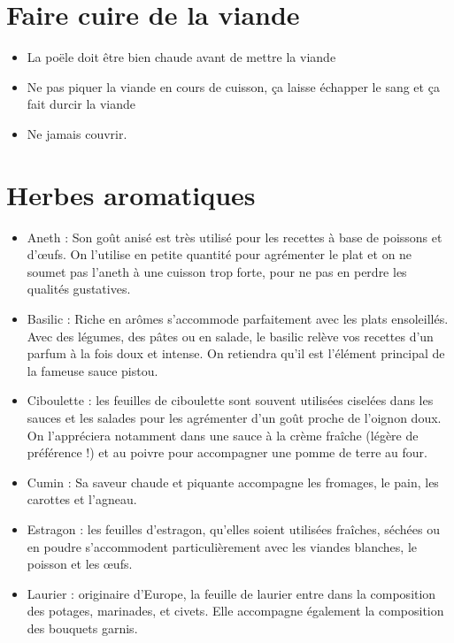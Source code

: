 \documentclass[a4paper,twoside]{report}
\begin{document}
\section{Faire cuire de la viande}
\begin{itemize}
\item La poële doit être bien chaude avant de mettre la viande
\item Ne pas piquer la viande en cours de cuisson, ça laisse échapper le sang et ça fait durcir la viande
\item Ne jamais couvrir.
\end{itemize}

\section{Herbes aromatiques}
\begin{itemize}
\item Aneth : Son goût anisé est très utilisé pour les recettes à base de poissons et d’œufs. On l’utilise en petite quantité pour agrémenter le plat et on ne soumet pas l’aneth à une cuisson trop forte, pour ne pas en perdre les qualités gustatives.

\item Basilic : Riche en arômes s’accommode parfaitement avec les plats ensoleillés. Avec des légumes, des pâtes ou en salade, le basilic relève vos recettes d’un parfum à la fois doux et intense. On retiendra qu’il est l’élément principal de la fameuse sauce pistou.

\item Ciboulette : les feuilles de ciboulette sont souvent utilisées ciselées dans les sauces et les salades pour les agrémenter d’un goût proche de l’oignon doux. On l’appréciera notamment dans une sauce à la crème fraîche (légère de préférence !) et au poivre pour accompagner une pomme de terre au four.

\item Cumin : Sa saveur chaude et piquante accompagne les fromages, le pain, les carottes et l’agneau.

\item Estragon : les feuilles d’estragon, qu’elles soient utilisées fraîches, séchées ou en poudre s’accommodent particulièrement avec les viandes blanches, le poisson et les œufs.

\item Laurier : originaire d’Europe, la feuille de laurier entre dans la composition des potages, marinades, et civets. Elle accompagne également la composition des bouquets garnis.


\end{itemize}
\end{document}
